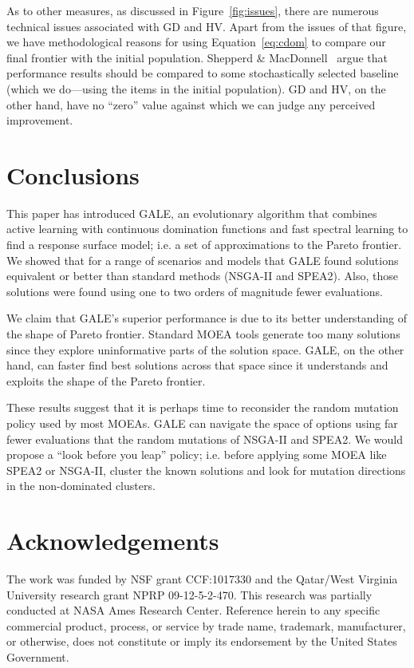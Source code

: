 \documentclass[10pt,journal,compsoc]{IEEEtran}
\newcommand{\eq}[1]{Equation~\ref{eq:#1}}
\newcommand{\fig}[1]{Figure~\ref{fig:#1}}
\begin{document}
As to other measures, as discussed in \fig{issues},
there are numerous technical issues associated with 
GD and HV. 
Apart from the issues of that figure, we have
methodological reasons for using \eq{cdom}
to compare our final frontier with the initial population.
Shepperd \& MacDonnell~\cite{shepperd12z} argue that 
performance results should be compared to
some stochastically selected baseline (which we do---using the items in
the initial population). 
GD and HV, on the other hand, have no ``zero'' value
against which we can judge any perceived improvement.



   
\section{Conclusions}
This paper has introduced GALE, an evolutionary
algorithm that combines active learning with
continuous domination functions and fast spectral
learning to find a response surface model; i.e. a
set of approximations to the Pareto frontier.
We showed that for a range of scenarios and models
that GALE found solutions equivalent or better than
standard methods (NSGA-II and SPEA2).  Also, those
solutions were found using one to two orders of
magnitude fewer evaluations.

We claim that GALE’s superior performance is due to
its better understanding of the shape of Pareto
frontier.  Standard MOEA tools generate too many
solutions since they explore uninformative parts of
the solution space.  GALE, on the other hand, can
faster find best solutions across that space since
it understands and exploits the shape of the Pareto
frontier.


These results suggest that it is perhaps time to reconsider the random
mutation policy used by most MOEAs.  GALE can navigate the space of
options using far fewer evaluations that the random mutations of
NSGA-II and SPEA2. We would propose a ``look before you leap'' policy;
i.e. before applying some MOEA like SPEA2 or NSGA-II, cluster the
known solutions and look for mutation directions in the non-dominated
clusters.

   

\section{Acknowledgements}

The work was funded by NSF grant CCF:1017330 and the
Qatar/West Virginia University research grant NPRP
09-12-5-2-470.  This research was partially
conducted at NASA Ames Research Center. Reference
herein to any specific commercial product, process,
or service by trade name, trademark, manufacturer,
or otherwise, does not constitute or imply its endorsement by the United States Government.
\end{document}
